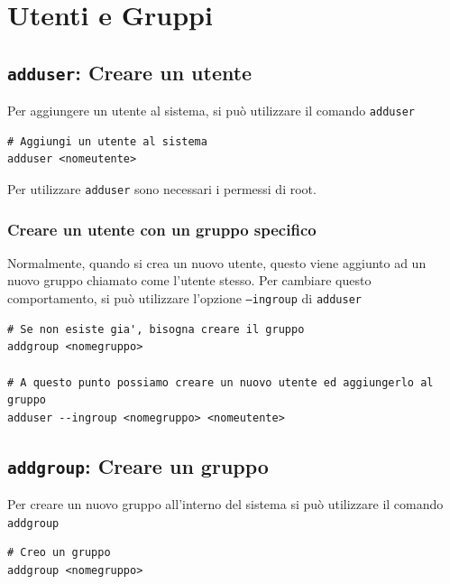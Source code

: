 \documentclass[a4paper]{report}
\newenvironment{ricordati}{\begin{tcolorbox}[fonttitle=\sffamily\bfseries\large,title=Ricordati,colframe=orange!75!white]}{\end{tcolorbox}}
\newenvironment{code}{\begin{tcolorbox}[size=small]}{\end{tcolorbox}}
\begin{document}
\chapter{Utenti e Gruppi}

\section{\texttt{adduser}: Creare un utente}

Per aggiungere un utente al sistema, si può utilizzare il comando \texttt{adduser}

\begin{code} 
\begin{lstlisting}
# Aggiungi un utente al sistema
adduser <nomeutente>
\end{lstlisting}
\end{code}

\begin{ricordati}
	Per utilizzare \texttt{adduser} sono necessari i permessi di root.
\end{ricordati}

\subsection{Creare un utente con un gruppo specifico}

Normalmente, quando si crea un nuovo utente, questo viene aggiunto ad un nuovo gruppo chiamato come l'utente stesso. Per cambiare questo comportamento, si può utilizzare l'opzione \texttt{--ingroup} di \texttt{adduser}

\begin{code} 
\begin{lstlisting}
# Se non esiste gia', bisogna creare il gruppo
addgroup <nomegruppo>

# A questo punto possiamo creare un nuovo utente ed aggiungerlo al gruppo
adduser --ingroup <nomegruppo> <nomeutente>
\end{lstlisting}
\end{code}

\section{\texttt{addgroup}: Creare un gruppo}

Per creare un nuovo gruppo all'interno del sistema si può utilizzare il comando \texttt{addgroup}
\begin{code} 
\begin{lstlisting}
# Creo un gruppo
addgroup <nomegruppo>
\end{lstlisting}
\end{code}
\end{document}

